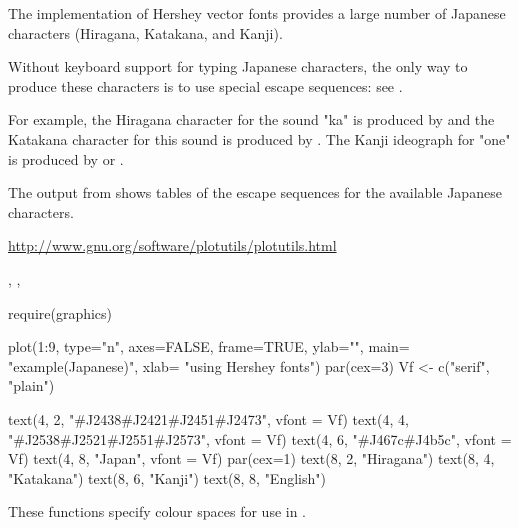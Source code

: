 %
\begin{Description}\relax
The implementation of Hershey vector fonts provides a large number of
Japanese characters (Hiragana, Katakana, and Kanji).
\end{Description}
%
\begin{Details}\relax
Without keyboard support for typing Japanese characters, the only way
to produce these characters is to use special escape sequences: see
.

For example, the Hiragana character for the sound "ka" is produced
by  and the Katakana character for this sound is
produced by .  The Kanji ideograph for "one" is
produced by  or .

The output from  shows tables of the escape
sequences for the available Japanese characters.
\end{Details}
%
\begin{References}\relax
\url{http://www.gnu.org/software/plotutils/plotutils.html}
\end{References}
%
\begin{SeeAlso}\relax
{}, , 
\end{SeeAlso}
%
\begin{Examples}
\begin{ExampleCode}
require(graphics)

plot(1:9, type="n", axes=FALSE, frame=TRUE, ylab="",
     main= "example(Japanese)", xlab= "using Hershey fonts")
par(cex=3)
Vf <- c("serif", "plain")

text(4, 2, "\#J2438\#J2421\#J2451\#J2473", vfont = Vf)
text(4, 4, "\#J2538\#J2521\#J2551\#J2573", vfont = Vf)
text(4, 6, "\#J467c\#J4b5c", vfont = Vf)
text(4, 8, "Japan", vfont = Vf)
par(cex=1)
text(8, 2, "Hiragana")
text(8, 4, "Katakana")
text(8, 6, "Kanji")
text(8, 8, "English")
\end{ExampleCode}
\end{Examples}
%
\begin{Description}\relax
These functions specify colour spaces for use in
.
\end{Description}
%
